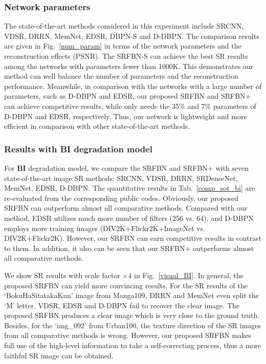 \documentclass[10pt,twocolumn,letterpaper]{article}
\begin{document}
	\subsubsection{Network parameters}
	The state-of-the-art methods considered in this experiment include SRCNN\cite{dong2016image}, VDSR\cite{Kim_2016_CVPR}, DRRN\cite{Tai_2017_CVPR},  MemNet\cite{Tong_2017_ICCV}, EDSR\cite{lim2017enhanced}, DBPN-S\cite{Haris_2018_CVPR} and D-DBPN\cite{Haris_2018_CVPR}. The comparison results are given in Fig.~\ref{num_param} in terms of the network parameters and the reconstruction effects (PSNR). The SRFBN-S can achieve the best SR results among the networks with parameters fewer than 1000K. This demonstrates our method can well balance the number of parameters and the reconstruction performance. Meanwhile, in comparison with the networks with a large number of parameters, such as D-DBPN and EDSR, our proposed SRFBN and SRFBN+ can achieve competitive results, while only needs the 35\% and 7\% parameters of D-DBPN and EDSR, respectively. Thus, our network is lightweight and more efficient in comparison with other state-of-the-art methods. 
	
	\subsubsection{Results with BI degradation model}
	For \textbf{BI} degradation model, we compare the SRFBN and SRFBN+ with seven state-of-the-art image SR methods: SRCNN\cite{dong2016image}, VDSR\cite{Kim_2016_CVPR}, DRRN\cite{Tai_2017_CVPR}, SRDenseNet\cite{Tong_2017_ICCV}, MemNet\cite{Tong_2017_ICCV}, EDSR\cite{lim2017enhanced}, D-DBPN\cite{Haris_2018_CVPR}. The quantitative results in Tab.~\ref{comp_sot_bi} are re-evaluated from the corresponding public codes. Obviously, our proposed SRFBN can outperform almost all comparative methods. Compared with our method, EDSR utilizes much more number of filters (256 vs. 64), and D-DBPN employs more training images (DIV2K+Flickr2K+ImageNet vs. DIV2K+Flickr2K). However, our SRFBN can earn competitive results in contrast to them. In addition, it also can be seen that our SRFBN+ outperforms almost all comparative methods. 
	
	We show SR results with scale factor $\times 4$ in Fig.~\ref{visual_BI}. In general, the proposed SRFBN can yield more convincing results.  For the SR results of the `BokuHaSitatakaKun' image from Manga109, DRRN and MemNet even split the `M' letter. VDSR, EDSR and D-DBPN fail to recover the clear image. The proposed SRFBN produces a clear image which is very close to the ground truth. Besides, for the `img\_092' from Urban100, 
	the texture direction of the SR images from all comparative methods is wrong. However, our proposed SRFBN makes full use of the high-level information to take a self-correcting process, thus a more faithful SR image can be obtained. 
	
\end{document}

